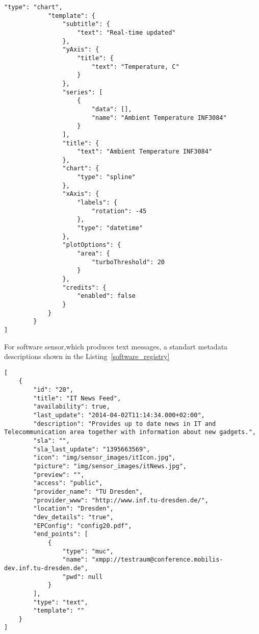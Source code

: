 \begin{lstlisting}[label=hardware_registry,caption=JSON Description Format]
            "type": "chart",
            "template": {
                "subtitle": {
                    "text": "Real-time updated"
                },
                "yAxis": {
                    "title": {
                        "text": "Temperature, C"
                    }
                },
                "series": [
                    {
                        "data": [],
                        "name": "Ambient Temperature INF3084"
                    }
                ],
                "title": {
                    "text": "Ambient Temperature INF3084"
                },
                "chart": {
                    "type": "spline"
                },
                "xAxis": {
                    "labels": {
                        "rotation": -45
                    },
                    "type": "datetime"
                },
                "plotOptions": {
                    "area": {
                        "turboThreshold": 20
                    }
                },
                "credits": {
                    "enabled": false
                }
            }
        }
]
\end{lstlisting}
For software sensor,which produces text messages, a standart metadata descriptions shown in the Listing~\ref{software_registry}
\begin{lstlisting}[label=software_registry,caption=JSON Description Format for Software Sensor]
[
    {
        "id": "20",
        "title": "IT News Feed",
        "availability": true,
        "last_update": "2014-04-02T11:14:34.000+02:00",
        "description": "Provides up to date news in IT and Telecommunication area together with information about new gadgets.",
        "sla": "",
        "sla_last_update": "1395663569",
        "icon": "img/sensor_images/itIcon.jpg",
        "picture": "img/sensor_images/itNews.jpg",
        "preview": "",
        "access": "public",
        "provider_name": "TU Dresden",
        "provider_www": "http://www.inf.tu-dresden.de/",
        "location": "Dresden",
        "dev_details": "true",
        "EPConfig": "config20.pdf",
        "end_points": [
            {
                "type": "muc",
                "name": "xmpp://testraum@conference.mobilis-dev.inf.tu-dresden.de",
                "pwd": null
            }
        ],
        "type": "text",
        "template": ""
    }
]
\end{lstlisting}

